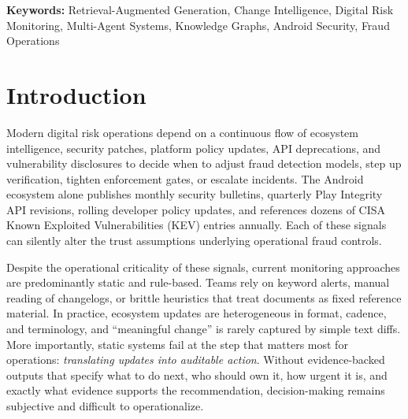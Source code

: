 \documentclass[
]{article}
\begin{document}
\begin{abstract}
most valuable on \textit{policy-compliance}, \textit{temporal-change},
and \textit{noisy/adversarial} queries, where structural linkage
outweighs dense similarity, and least valuable on free-text
\textit{component} and \textit{natural-language} queries, where a
regex-based extractor recovers few entities. The large margin over a
standalone KG-only configuration ($\Delta$R@5\,=\,$+0.328$,
$p < 0.001$, Holm-corrected) is therefore read as a diagnostic of that
extraction bottleneck rather than a competitive result. All variants
reject 100\% of out-of-scope queries. The system achieves
reliable structured-output generation from lightweight LLMs (Llama 3.1
8B) within a multi-agent architecture (Sentinel triage + Coordinator
synthesis) that surfaces prioritized, traceable recommendations to
fraud operations teams.
\end{abstract}


\noindent\textbf{Keywords:} Retrieval-Augmented Generation, Change Intelligence,
Digital Risk Monitoring, Multi-Agent Systems, Knowledge Graphs, Android
Security, Fraud Operations

\section{Introduction}\label{introduction}

Modern digital risk operations depend on a continuous flow of ecosystem
intelligence, security patches, platform policy updates, API
deprecations, and vulnerability disclosures to decide when to adjust
fraud detection models, step up verification, tighten enforcement gates,
or escalate incidents. The Android ecosystem alone publishes monthly
security bulletins, quarterly Play Integrity API revisions, rolling
developer policy updates, and references dozens of CISA Known Exploited
Vulnerabilities (KEV) entries annually. Each of these signals can
silently alter the trust assumptions underlying operational fraud
controls.

Despite the operational criticality of these signals, current monitoring
approaches are predominantly static and rule-based. Teams rely on
keyword alerts, manual reading of changelogs, or brittle heuristics that
treat documents as fixed reference material. In practice, ecosystem
updates are heterogeneous in format, cadence, and terminology, and
``meaningful change'' is rarely captured by simple text diffs. More
importantly, static systems fail at the step that matters most for
operations: \emph{translating updates into auditable action}. Without
evidence-backed outputs that specify what to do next, who should own it,
how urgent it is, and exactly what evidence supports the recommendation,
decision-making remains subjective and difficult to operationalize.
\end{document}
